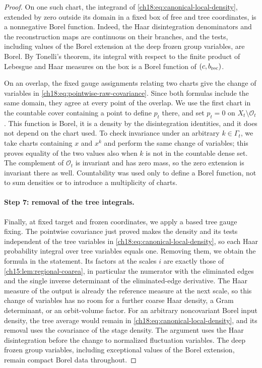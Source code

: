 \begin{proof}
On one such chart, the integrand of \eqref{ch18:eq:canonical-local-density}, extended by zero outside its domain in a fixed box of free and tree coordinates, is a nonnegative Borel function. Indeed, the Haar disintegration denominators and the reconstruction maps are continuous on their branches, and the tests, including values of the Borel extension at the deep frozen group variables, are Borel. By Tonelli's theorem, its integral with respect to the finite product of Lebesgue and Haar measures on the box is a Borel function of $(c,b_{\mathrm{rec}})$.

On an overlap, the fixed gauge assignments relating two charts give the change of variables in \eqref{ch18:eq:pointwise-raw-covariance}. Since both formulas include the same domain, they agree at every point of the overlap. We use the first chart in the countable cover containing a point to define $p_t$ there, and set $p_t=0$ on $X_t\setminus\mathcal O_t$. This function is Borel, it is a density by the disintegration identities, and it does not depend on the chart used. To check invariance under an arbitrary $k\in\Gamma_t$, we take charts containing $x$ and $x^k$ and perform the same change of variables; this proves equality of the two values also when $k$ is not in the countable dense set. The complement of $\mathcal O_t$ is invariant and has zero mass, so the zero extension is invariant there as well. Countability was used only to define a Borel function, not to sum densities or to introduce a multiplicity of charts.

\paragraph{Step 7: removal of the tree integrals.}
Finally, at fixed target and frozen coordinates, we apply a based tree gauge fixing. The pointwise covariance just proved makes the density and its tests independent of the tree variables in \eqref{ch18:eq:canonical-local-density}, so each Haar probability integral over tree variables equals one. Removing them, we obtain the formula in the statement. Its factors at the scales $i$ are exactly those of \cref{ch15:lem:regional-coarea}, in particular the numerator with the eliminated edges and the single inverse determinant of the eliminated-edge derivative. The Haar measure of the output is already the reference measure at the next scale, so this change of variables has no room for a further coarse Haar density, a Gram determinant, or an orbit-volume factor. For an arbitrary noncovariant Borel input density, the tree average would remain in \eqref{ch18:eq:canonical-local-density}, and its removal uses the covariance of the stage density. The argument uses the Haar disintegration before the change to normalized fluctuation variables. The deep frozen group variables, including exceptional values of the Borel extension, remain compact Borel data throughout.
\end{proof}

